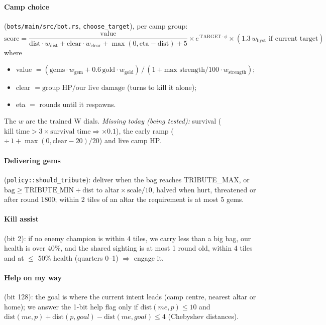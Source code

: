 \documentclass[11pt,a4paper]{article}
\newcommand{\f}[1]{\texttt{#1}}
\begin{document}
\paragraph{Camp choice} (\f{bots/main/src/bot.rs}, \f{choose\_target}), per camp group:
\[
\text{score} = \frac{\text{value}}{\text{dist}\cdot w_{\text{dist}} + \text{clear}\cdot w_{\text{clear}} + \max(0, \text{eta}-\text{dist}) + 5}
\times e^{\,\text{TARGET}\cdot\phi} \times (1.3\,w_{\text{hyst}} \text{ if current target})
\]
where
\begin{itemize}
\item value $= (\text{gems}\cdot w_{\text{gem}} + 0.6\,\text{gold}\cdot w_{\text{gold}}) \,/\, (1 + \text{max strength}/100 \cdot w_{\text{strength}})$;
\item clear $= \text{group HP} / \text{our live damage}$ (turns to kill it alone);
\item eta $=$ rounds until it respawns.
\end{itemize} The $w$ are the trained W dials. \emph{Missing today (being tested):} survival
($\text{kill time} > 3 \times \text{survival time} \Rightarrow \times 0.1$), the early ramp
($\div\, 1 + \max(0, \text{clear} - 20)/20$) and live camp HP.

\paragraph{Delivering gems} (\f{policy::should\_tribute}): deliver when the bag reaches TRIBUTE\_MAX, or
$\text{bag} \ge \text{TRIBUTE\_MIN} + \text{dist to altar} \times \text{scale}/10$, halved when hurt, threatened
or after round 1800; within 2 tiles of an altar the requirement is at most 5 gems.

\paragraph{Kill assist} (bit 2): if no enemy champion is within 4 tiles, we carry less than a big bag, our
health is over 40\%, and the shared sighting is at most 1 round old, within 4 tiles and at $\le$ 50\% health
(quarters 0--1) $\Rightarrow$ engage it.

\paragraph{Help on my way} (bit 128): the goal is where the current intent leads (camp centre, nearest altar
or home); we answer the 1-bit help flag only if $\text{dist}(me, p) \le 10$ and
$\text{dist}(me,p) + \text{dist}(p, goal) - \text{dist}(me, goal) \le 4$ (Chebyshev distances).
\end{document}
